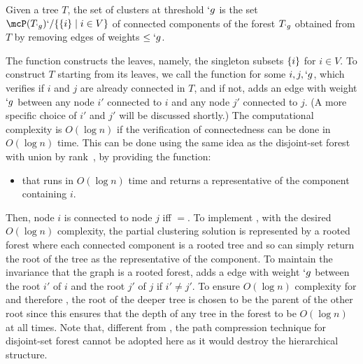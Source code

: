 \begin{Definition}
\label{def:data-structure}
	Given a tree $T$, the set of clusters at threshold $`g$ is the set $\mcP(T_{`g})`/\Set {\Set {i} \mid i\in V}$ of
	connected components of the forest $T_{`g}$ obtained from $T$ by removing edges of weights $\leq
	`g$.
\end{Definition}

The function \initialize constructs the leaves, namely, the singleton subsets $\{i\}$ for $i\in V$.
To construct $T$ starting from its leaves, we call the function  for some $i,j,`g$, which verifies if $i$ and $j$ are already connected in $T$, and
if not, adds an edge with weight $`g$ between any node $i'$ connected to $i$ and any node $j'$
connected to $j$.
(A more specific choice of $i'$ and $j'$ will be discussed shortly.)
The computational complexity is $O(\log n)$ if the verification of connectedness can be
done in $O(\log n)$ time. This can be done using the same idea as the disjoint-set forest 
with union by rank~\cite{galler64,tarjan84}, by providing the function: 
\begin{itemize}
	\item {} that runs in $O(\log n)$ time and returns a representative of the component containing $i$.
\end{itemize}
Then, node $i$ is connected to node $j$ iff $=$.
To implement \find, with the desired $O(\log n)$ complexity, the partial clustering solution is represented by a rooted
forest where each connected component is a rooted tree and so \find can simply return the root of
the tree as the representative of the component.
To maintain the invariance that the graph is a
rooted forest,  adds a edge with weight $`g$ between the root $i'$ of $i$
and the root $j'$ of $j$ if $i'\neq j'$. To ensure $O(\log n)$ complexity for \find and therefore
\merge, the root of the deeper tree is chosen to be the parent of the other root since this 
ensures that the depth of any tree in the forest to be $O(\log n)$ at all times. Note that, different from \cite{felzenszwalb2004efficient}, the path compression technique for disjoint-set forest cannot be adopted here as it would destroy the hierarchical structure. 

